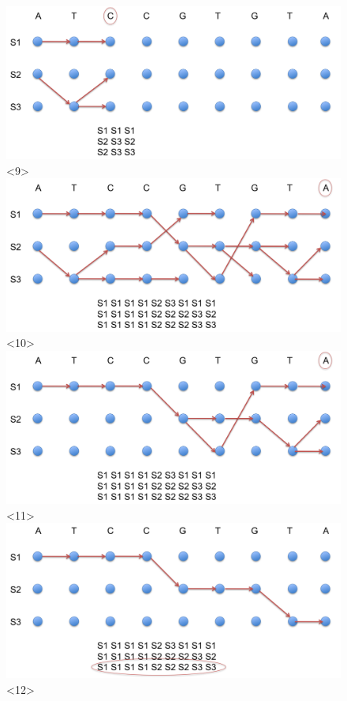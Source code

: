 \documentclass{beamer}[12pt]
\begin{document}
\begin{frame}
\begin{figure}[h]
			\includegraphics[width=1.0\textwidth]{../picturesforthepresentation/Viterbi9.png}<9>
			\includegraphics[width=1.0\textwidth]{../picturesforthepresentation/Viterbi10.png}<10>
			\includegraphics[width=1.0\textwidth]{../picturesforthepresentation/Viterbi11.png}<11>
			\includegraphics[width=1.0\textwidth]{../picturesforthepresentation/Viterbi12.png}<12>			
		\end{figure}

\end{frame}
\end{document}
